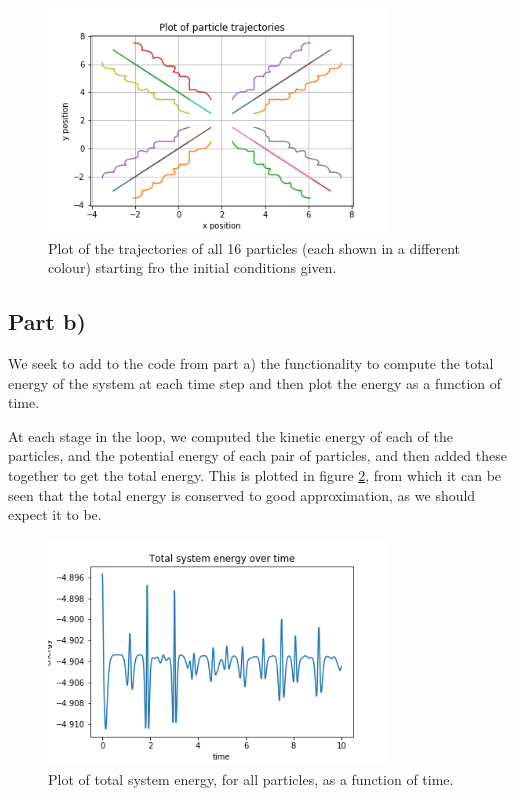\documentclass{article}
\begin{document}
\begin{figure}[H]
	\centering
	\includegraphics[width=0.8\textwidth]{../images/q3_a.png}
	\caption{Plot of the trajectories of all 16 particles (each shown in a different colour) starting fro the initial conditions given.}
	\label{fig:q3_a}
\end{figure}

\subsection{Part b)}

We seek to add to the code from part a) the functionality to compute the total energy of the system at each time step and then plot the energy as a function of time.

At each stage in the loop, we computed the kinetic energy of each of the particles, and the potential energy of each pair of particles, and then added these together to get the total energy. This is plotted in figure \ref{fig:q3_b}, from which it can be seen that the total energy is conserved to good approximation, as we should expect it to be.

\begin{figure}[H]
	\centering
	\includegraphics[width=0.8\textwidth]{../images/q3_b.png}
	\caption{Plot of total system energy, for all particles, as a function of time.}
	\label{fig:q3_b}
\end{figure}
\end{document}

